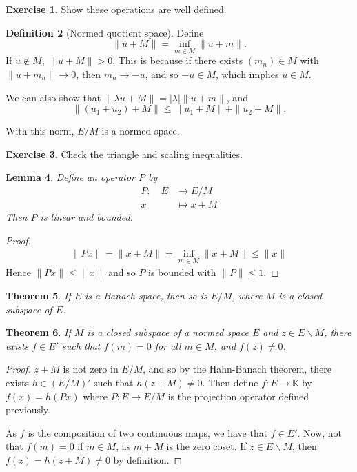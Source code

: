 \documentclass[10pt, oneside, reqno]{amsart}
\theoremstyle{plain}%
\newtheorem{thm}{Theorem}[section]
\newtheorem{lem}[thm]{Lemma}
\numberwithin{equation}{section}
\theoremstyle{definition}
\newtheorem{defn}[thm]{Definition}
\newtheorem{exer}[thm]{Exercise}
\theoremstyle{remark}
\newcommand{\K}{\mathbb{K}}
\newcommand{\mapping}[5]{\begin{align*}
    #1 : \quad     #2 &\rightarrow #3 \\
            #4  &\mapsto #5
\end{align*}    
}
\begin{document}
\begin{exer}
    Show these operations are well defined.  
\end{exer}  

\begin{defn}[Normed quotient space]
    Define \[
    \| u + M \| = \inf_{m \in M} \| u + m \|. 
    \]  If $u \notin M$, $\| u + M \| > 0$.  This is because if there exists $(m_n) \in M$ with $\| u + m_n \| \rightarrow 0$, then $m_n \rightarrow -u$, and so $-u \in M$, which implies $u \in M$.  

    We can also show that  $\| \lambda u + M \| = |\lambda| \| u + m \|$, and \[
        \| (u_1 + u_2) + M \| \leq \| u_1 + M \| + \| u_2 + M \|.
    \]  

    With this norm, $E/M$ is a normed space.
\end{defn}

\begin{exer}
    Check the triangle and scaling inequalities.
\end{exer}

\begin{lem}
    Define an operator $P$ by \mapping{P}{E}{E/M}{x}{x + M}  Then $P$ is linear and bounded.  
\end{lem}  


\begin{proof}
    \begin{align*}
        \| Px \| = \| x + M \| = \inf_{m \in M} \| x + M \| \leq \| x \|
    \end{align*}  Hence $\| Px \| \leq \| x \|$ and so $P$ is bounded with $\| P \| \leq 1$.  
\end{proof}

\begin{thm}
    If $E$ is a Banach space, then so is $E / M$, where $M$ is a closed subspace of $E$. 
\end{thm}

\begin{thm}
    If $M$ is a closed subspace of a normed space $E$ and $z \in E \backslash M$, there exists $f \in E'$ such that $f(m) = 0$ for all $m \in M$, and $f(z) \neq 0$.  
\end{thm}

\begin{proof}
    $z + M$ is not zero in $E/M$, and so by the Hahn-Banach theorem, there exists $h \in (E/M)'$ such that $h(z+M) \neq 0$.  Then define $f: E \rightarrow \K$ by $f(x) = h(Px)$ where $P : E \rightarrow E/M$ is the projection operator defined previously.
    
    As $f$ is the composition of two continuous maps, we have that $f \in E'$.  Now, not that $f(m) = 0$ if $m \in M$, as $m + M$ is the zero coset.  If $z \in E\backslash M$, then $f(z) = h(z+M) \neq 0$ by definition.         
\end{proof}  
\end{document}
